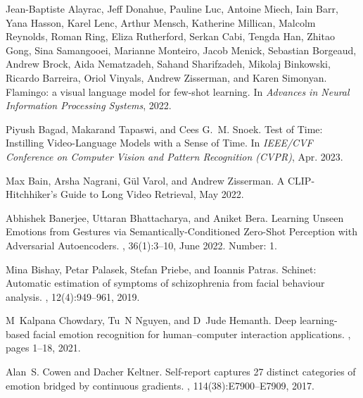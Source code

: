 \documentclass[10pt,twocolumn,letterpaper]{article}
\begin{document}
{\small

\begin{thebibliography}{10}\itemsep=-1pt

Jean-Baptiste Alayrac, Jeff Donahue, Pauline Luc, Antoine Miech, Iain Barr,
  Yana Hasson, Karel Lenc, Arthur Mensch, Katherine Millican, Malcolm Reynolds,
  Roman Ring, Eliza Rutherford, Serkan Cabi, Tengda Han, Zhitao Gong, Sina
  Samangooei, Marianne Monteiro, Jacob Menick, Sebastian Borgeaud, Andrew
  Brock, Aida Nematzadeh, Sahand Sharifzadeh, Mikolaj Binkowski, Ricardo
  Barreira, Oriol Vinyals, Andrew Zisserman, and Karen Simonyan.
\newblock Flamingo: a visual language model for few-shot learning.
\newblock In {\em Advances in Neural Information Processing Systems}, 2022.

Piyush Bagad, Makarand Tapaswi, and Cees G.~M. Snoek.
\newblock Test of {Time}: {Instilling} {Video}-{Language} {Models} with a
  {Sense} of {Time}.
\newblock In {\em IEEE/CVF Conference on Computer Vision and Pattern
  Recognition (CVPR)}, Apr. 2023.

Max Bain, Arsha Nagrani, Gül Varol, and Andrew Zisserman.
\newblock A {CLIP}-{Hitchhiker}'s {Guide} to {Long} {Video} {Retrieval}, May
  2022.

Abhishek Banerjee, Uttaran Bhattacharya, and Aniket Bera.
\newblock Learning {Unseen} {Emotions} from {Gestures} via
  {Semantically}-{Conditioned} {Zero}-{Shot} {Perception} with {Adversarial}
  {Autoencoders}.
,
  36(1):3--10, June 2022.
\newblock Number: 1.

Mina Bishay, Petar Palasek, Stefan Priebe, and Ioannis Patras.
\newblock Schinet: Automatic estimation of symptoms of schizophrenia from
  facial behaviour analysis.
, 12(4):949--961, 2019.

M~Kalpana Chowdary, Tu~N Nguyen, and D~Jude Hemanth.
\newblock Deep learning-based facial emotion recognition for human--computer
  interaction applications.
, pages 1--18, 2021.

Alan~S. Cowen and Dacher Keltner.
\newblock Self-report captures 27 distinct categories of emotion bridged by
  continuous gradients.
,
  114(38):E7900--E7909, 2017.


\end{thebibliography}}
\end{document}
